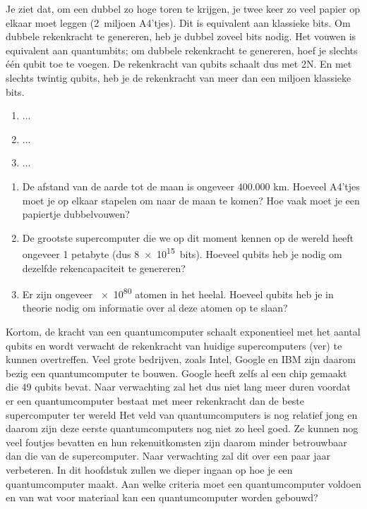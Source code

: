 \documentclass[../../main.tex]{subfiles}
\begin{document}
Je ziet dat, om een dubbel zo hoge toren te krijgen, je twee keer zo veel papier op elkaar moet leggen (2~miljoen A4'tjes). Dit is equivalent aan klassieke bits. Om dubbele rekenkracht te genereren, heb je dubbel zoveel bits nodig. Het vouwen is equivalent aan quantumbits; om dubbele rekenkracht te genereren, hoef je slechts \'e\'en qubit toe te voegen. De rekenkracht van qubits schaalt dus met 2N. En met slechts twintig qubits, heb je de rekenkracht van meer dan een miljoen klassieke bits.

\begin{antwoord}
\begin{enumerate}
\item ...
\item ...
\item ...
\end{enumerate}
\end{antwoord}
\begin{opdracht}
\begin{enumerate}
\item De afstand van de aarde tot de maan is ongeveer 400.000 km. Hoeveel A4'tjes moet je op elkaar stapelen om naar de maan te komen? Hoe vaak moet je een papiertje dubbelvouwen?
\item De grootste supercomputer die we op dit moment kennen op de wereld heeft ongeveer 1 petabyte (dus \num{8e15}~bits). Hoeveel qubits heb je nodig om dezelfde rekencapaciteit te genereren?
\item Er zijn ongeveer \num{e80} atomen in het heelal. Hoeveel qubits heb je in theorie nodig om informatie over al deze atomen op te slaan? 
\end{enumerate}
\end{opdracht}

Kortom, de kracht van een quantumcomputer schaalt exponentieel met het aantal qubits en wordt verwacht de rekenkracht van huidige supercomputers (ver) te kunnen overtreffen. Veel grote bedrijven, zoals Intel, Google en IBM zijn daarom bezig een quantumcomputer te bouwen. Google heeft zelfs al een chip gemaakt die 49 qubits bevat. Naar verwachting zal het dus niet lang meer duren voordat er een quantumcomputer bestaat met meer rekenkracht dan de beste supercomputer ter wereld
Het veld van quantumcomputers is nog relatief jong en daarom zijn deze eerste quantumcomputers nog niet zo heel goed. Ze kunnen nog veel foutjes bevatten en hun rekenuitkomsten zijn daarom minder betrouwbaar dan die van de supercomputer. Naar verwachting zal dit over een paar jaar verbeteren. In dit hoofdstuk zullen we dieper ingaan op hoe je een quantumcomputer maakt. Aan welke criteria moet een quantumcomputer voldoen en van wat voor materiaal kan een quantumcomputer worden gebouwd? 
\end{document}
